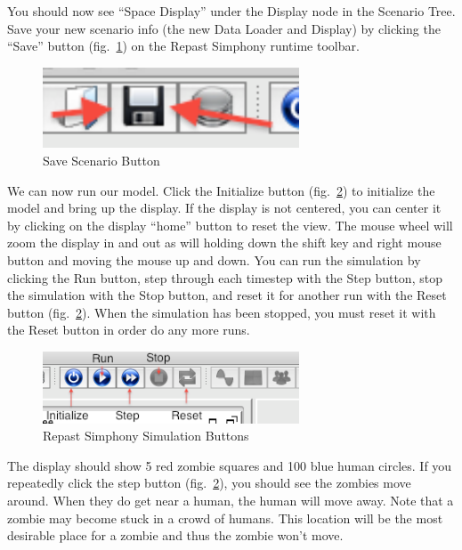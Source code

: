 \documentclass[11pt]{amsart}
\begin{document}
You should now see ``Space Display'' under the Display node in the Scenario Tree. Save your new scenario info (the new Data Loader and Display) by clicking the ``Save'' button (fig.~\ref{fig:save_button}) on the Repast Simphony runtime toolbar.

\begin{figure}[h]
\begin{center}
\vspace{.2in}
\centerline {
\includegraphics[width=3in]{GettingStartedImages/save_button.png}
}
\caption{Save Scenario Button}
\label{fig:save_button}
\end{center}
\end{figure}


We can now run our model. Click the Initialize button (fig.~\ref{fig:buttons}) to initialize the model and bring up the display. If the display is not centered, you can center it by clicking on the display ``home'' button to reset the view. The mouse wheel will zoom the display in and out as will holding down the shift key and right mouse button and moving the mouse up and down. You can run the simulation by clicking the Run button, step through each timestep with the Step button, stop the simulation with the Stop button, and reset it for another run with the Reset button (fig.~\ref{fig:buttons}). When the simulation has been stopped, you must reset it with the Reset button in order do any more runs.

\begin{figure}[h]
\begin{center}
\vspace{.2in}
\centerline {
\includegraphics[width=3in]{GettingStartedImages/buttons.png}
}
\caption{Repast Simphony Simulation Buttons}
\label{fig:buttons}
\end{center}
\end{figure}

The display should show 5 red zombie squares and 100 blue human circles. If you repeatedly click the step button  (fig.~\ref{fig:buttons}), you should see the zombies move around. When they do get near a human, the human will move away. Note that a zombie may become stuck in a crowd of humans. This location will be the most desirable place for a zombie and thus the zombie won't move.
\end{document}
